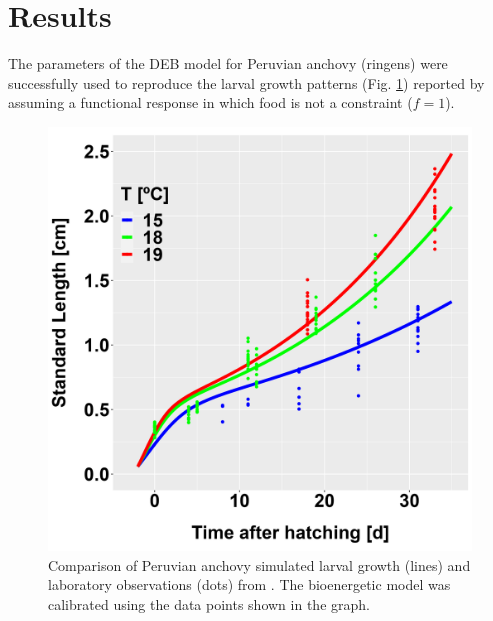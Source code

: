 \section{Results}

The parameters of the DEB model for Peruvian anchovy (\gls{ringens}) were successfully used to reproduce the larval growth patterns (Fig. \ref{Chap4DEB_out_f1_vsArturoLab}) reported by \citep{RiouOfel2021,OfelMoya2023} assuming a functional response in which food is not a constraint ($f=1$).\\

\begin{figure}[H]
	\includegraphics[width=1.0\textwidth]{figures/Chap4DEB_out_f1_vsArturoLab.png}
	\centering
	\caption{Comparison of Peruvian anchovy simulated larval growth (lines) and laboratory observations (dots) from \cite{RiouOfel2021,OfelMoya2023}. The bioenergetic model was calibrated using the data points shown in the graph.}
	\label{Chap4DEB_out_f1_vsArturoLab}
\end{figure}


